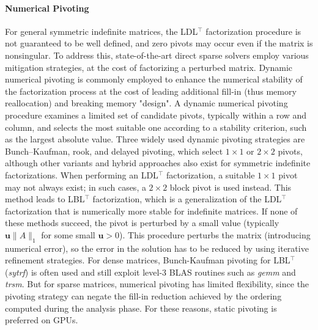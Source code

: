 \documentclass{article}
\begin{document}


\paragraph{Numerical Pivoting}
For general symmetric indefinite matrices, the LDL$^\top$ factorization procedure is not guaranteed to be well defined, and zero pivots may occur even if the matrix is nonsingular.
To address this, state-of-the-art direct sparse solvers employ various mitigation strategies, at the cost of factorizing a perturbed matrix.
Dynamic numerical pivoting is commonly employed to enhance the numerical stability of the factorization process at the cost of leading additional fill-in (thus memory reallocation) and breaking memory "design".
A dynamic numerical pivoting procedure examines a limited set of candidate pivots, typically within a row and column, and selects the most suitable one according to a stability criterion, such as the largest absolute value.
Three widely used dynamic pivoting strategies are Bunch–Kaufman, rook, and delayed pivoting, which select $1 \times 1$ or $2 \times 2$ pivots, although other variants and hybrid approaches also exist for symmetric indefinite factorizations.
When performing an LDL$^\top$ factorization, a suitable $1 \times 1$ pivot may not always exist; in such cases, a $2 \times 2$ block pivot is used instead.
This method leads to LBL$^\top$ factorization, which is a generalization of the LDL$^\top$ factorization that is numerically more stable for indefinite matrices.
If none of these methods succeed, the pivot is perturbed by a small value (typically $\mathbf{u}\|A\|_1$ for some small $\mathbf{u} > 0$). This procedure perturbs the matrix (introducing numerical error), so the error in the solution has to be reduced by using iterative refinement strategies. For dense matrices, Bunch-Kaufman pivoting for LBL$^\top$ (\emph{sytrf}) is often used and still exploit level-3 BLAS routines such as \emph{gemm} and \emph{trsm}.
But for sparse matrices, numerical pivoting has limited flexibility, since the pivoting strategy can negate the fill-in reduction achieved by the ordering computed during the analysis phase.
For these reasons, static pivoting is preferred on GPUs.
\end{document}

